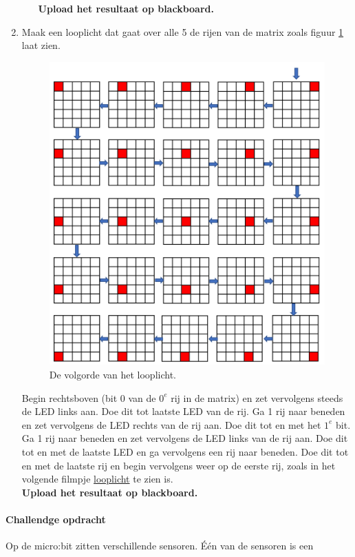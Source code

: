 \begin{enumerate}
\begin{enumerate}
\textbf{Upload het resultaat op blackboard.}
\end{enumerate}
\item Maak een looplicht dat gaat over alle 5 de rijen van de matrix zoals figuur \ref{fig:loopl} laat zien.

\begin{figure}[h!]
	\captionsetup{justification=centering}
\includegraphics[width=0.6 \linewidth]{figuren/looplicht}
\centering
\caption{De volgorde van het looplicht.}
\label{fig:loopl}
\end{figure}

Begin rechtsboven (bit 0 van de ${0^{e}}$ rij in de matrix) en zet vervolgens steeds de LED links aan. Doe dit tot laatste LED van de rij.
Ga 1 rij naar beneden en zet vervolgens de LED rechts van de rij aan. Doe dit tot en met het $1^{e}$ bit.
Ga 1 rij naar beneden en zet vervolgens de LED links van de rij aan. Doe dit tot en met de laatste LED en ga vervolgens een rij naar beneden.
Doe dit tot en met de laatste rij en begin vervolgens weer op de eerste rij, zoals in het volgende filmpje \href{https://www.youtube.com/shorts/8ZyYWEiXsm0} {
	looplicht}
	te zien is.\\
\textbf{Upload het resultaat op blackboard.}
\end{enumerate}

\paragraph{Challendge opdracht}

Op de micro:bit zitten verschillende sensoren. Één van de sensoren is een 